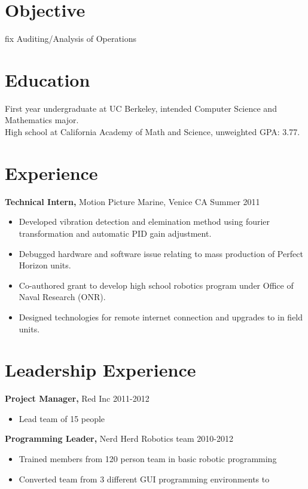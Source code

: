 \documentclass[margin]{res}
\begin{document}
\begin{resume}

\section{Objective}
fix
Auditing/Analysis of Operations

\section{Education}
First year undergraduate at UC Berkeley, intended Computer Science and Mathematics major. \\
High school at California Academy of Math and Science, unweighted GPA: 3.77.


\section{Experience}
{\bf Technical Intern,} Motion Picture Marine, Venice CA \hfill Summer 2011
\begin{itemize} \itemsep -2pt  %
  \item Developed vibration detection and elemination method using fourier transformation and automatic PID gain adjustment.
  \item Debugged hardware and software issue relating to mass production of Perfect Horizon units.
  \item Co-authored grant to develop high school robotics program under Office of Naval Research (ONR).
  \item Designed technologies for remote internet connection and upgrades to in field units.
\end{itemize}


\section{Leadership Experience}
{\bf Project Manager,} Red Inc \hfill 2011-2012
\begin{itemize} \itemsep -2pt
  \item Lead team of 15 people
\end{itemize}
{\bf Programming Leader,} Nerd Herd Robotics team \hfill 2010-2012
\begin{itemize} \itemsep -2pt
  \item Trained members from 120 person team in basic robotic programming
  \item Converted team from 3 different GUI programming environments to
\end{itemize}


\end{resume}
\end{document}
